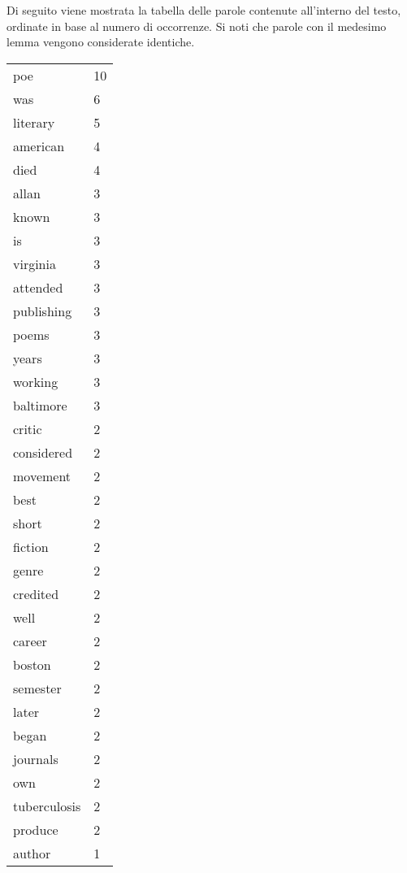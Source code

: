 \newpage
Di seguito viene mostrata la tabella delle parole contenute all'interno del testo,
ordinate in base al numero di occorrenze.
Si noti che parole con il medesimo lemma vengono considerate identiche.

\begin{center}
\begin{scriptsize}
\begin{tabular}{|ll|}
\hline
poe           & 10\\%
was           & 6\\%
literary      & 5\\%
american      & 4\\%
died          & 4\\%
allan         & 3\\%
known         & 3\\%
is            & 3\\%
virginia      & 3\\%
attended      & 3\\%
publishing    & 3\\%
poems         & 3\\%
years         & 3\\%
working       & 3\\%
baltimore     & 3\\%
critic        & 2\\%
considered    & 2\\%
movement      & 2\\%
best          & 2\\%
short         & 2\\%
fiction       & 2\\%
genre         & 2\\%
credited      & 2\\%
well          & 2\\%
career        & 2\\%
boston        & 2\\%
semester      & 2\\%
later         & 2\\%
began         & 2\\%
journals      & 2\\%
own           & 2\\%
tuberculosis  & 2\\%
produce       & 2\\%
author        & 1\\%

\end{tabular}
\end{scriptsize}
\end{center}
